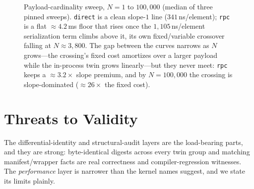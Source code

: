 \documentclass[conference]{IEEEtran}
\newcommand{\code}[1]{\texttt{#1}}
\begin{document}
\begin{figure}[t]
\centering
{}
\caption{Payload-cardinality sweep, $N{=}1$ to $100{,}000$ (median of three pinned
sweeps). \code{direct} is a clean slope-$1$ line ($341$\,ns/element); \code{rpc}
is a flat $\approx$$4.2$\,ms floor that rises once the $1{,}105$\,ns/element
serialization term climbs above it, its own fixed/variable crossover falling at
$N\approx3{,}800$. The gap between the curves narrows as $N$ grows---the crossing's
fixed cost amortizes over a larger payload while the in-process twin grows
linearly---but they never meet: \code{rpc} keeps a $\approx$$3.2\times$ slope
premium, and by $N{=}100{,}000$ the crossing is slope-dominated
($\approx$$26\times$ the fixed cost).}
\label{fig:payload}
\end{figure}

\section{Threats to Validity}
\label{sec:threats}

The differential-identity and structural-audit layers are the load-bearing
parts, and they are strong: byte-identical digests across every twin group and
matching manifest/wrapper facts are real correctness and compiler-regression
witnesses. The \emph{performance} layer is narrower than the kernel names
suggest, and we state its limits plainly.
\end{document}
